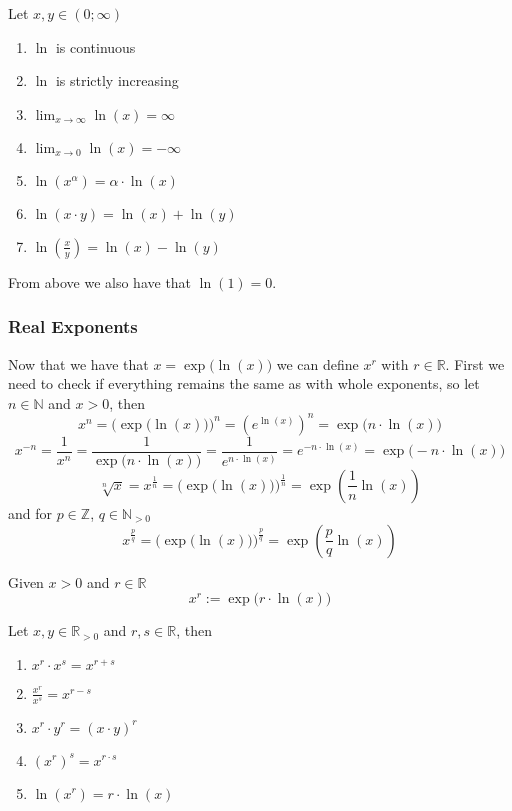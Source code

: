 \begin{proposition}[Properties]
   Let \(x, y \in (0; \infty)\)
   \begin{enumerate}[label=\roman*, align=Center]
      \item \(\ln\) is continuous
      \item \(\ln\) is strictly increasing
      \item \(\lim_{x \to \infty} \ln(x) = \infty\)
      \item \(\lim_{x \to 0} \ln(x) = -\infty\)
      \item \(\ln(x^\alpha) = \alpha \cdot \ln(x)\)
      \item \(\ln(x \cdot y) = \ln(x) + \ln(y)\)
      \item \(\ln\left(\frac{x}{y}\right) = \ln(x) - \ln(y)\)
   \end{enumerate}
\end{proposition}
\begin{remark}
   From above we also have that \(\ln(1) = 0\).
\end{remark}

\subsubsection{Real Exponents}
Now that we have that \(x = \exp\big(\ln(x)\big)\) we can define \(x^r\) with \(r \in \mathbb{R}\).
First we need to check if everything remains the same as with whole exponents, so let \(n \in \mathbb{N}\) and \(x > 0\), then
\[x^n = \Big(\exp\big(\ln(x)\big)\Big)^n = \left(e^{\ln(x)}\right)^n = \exp\big(n \cdot \ln(x)\big)\]
\[x^{-n} = \frac{1}{x^n} = \frac{1}{\exp\big(n \cdot \ln(x)\big)} = \frac{1}{e^{n \cdot \ln(x)}} = e^{-n \cdot \ln(x)} = \exp\big(-n \cdot \ln(x)\big)\]
\[\sqrt[n]{x} = x^{\frac{1}{n}} = \Big(\exp\big(\ln(x)\big)\Big)^\frac{1}{n} = \exp\left(\frac{1}{n} \ln(x)\right)\]
and for \(p \in \mathbb{Z}\), \(q \in \mathbb{N}_{>0}\)
\[x^\frac{p}{q} = \Big(\exp\big(\ln(x)\big)\Big)^\frac{p}{q} = \exp\left(\frac{p}{q} \ln(x)\right)\]

\begin{definition}\label{def:real_exponents}
   Given \(x > 0\) and \(r \in \mathbb{R}\)
   \[x^r := \exp\big(r \cdot \ln(x)\big)\]
\end{definition}

\begin{proposition}
   Let \(x, y \in \mathbb{R}_{>0}\) and \(r, s \in \mathbb{R}\), then
   \begin{enumerate}[label=\roman*, align=Center]
      \item \(x^r \cdot x^s = x^{r + s}\)
      \item \(\frac{x^r}{x^s} = x^{r-s}\)
      \item \(x^r \cdot y^r = (x \cdot y)^r\)
      \item \((x^r)^s = x^{r \cdot s}\)
      \item \(\ln(x^r) = r \cdot \ln(x)\)
   \end{enumerate}
\end{proposition}

